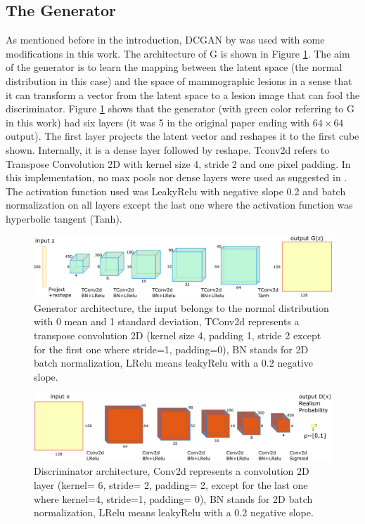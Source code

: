 \documentclass[final,3p,twocolumn,authoryear,sort&compress,times]{maia}
\begin{document}
\subsection{The Generator}
As mentioned before in the introduction, DCGAN by \citet{radford_DCGAN} was used with some modifications in this work. The architecture of G is shown in Figure \ref{fig:arch_Gen}.
The aim of the generator is to learn the mapping between the latent space (the normal distribution in this case) and the space of mammographic lesions in a sense that it can transform a vector from the latent space to a lesion image that can fool the discriminator. Figure \ref{fig:arch_Gen} shows that the generator (with green color referring to G in this work) had six layers (it was 5 in the original paper ending with $64 \times 64$ output). The first layer projects the latent vector and reshapes it to the first cube shown. Internally, it is a dense layer followed by reshape. Tconv2d refers to Transpose Convolution 2D with kernel size 4, stride 2 and one pixel padding. In this implementation, no max pools nor dense layers were used as suggested in \citet{radford_DCGAN}. The activation function used was LeakyRelu with negative slope 0.2 and batch normalization on all layers except the last one where the activation function was hyperbolic tangent (Tanh).
\begin{figure}[htp]
    \centering
    \includegraphics[scale=0.34]{figures/G_architecture.pdf}
    \caption{Generator architecture, the input belongs to the normal distribution with 0 mean and 1 standard deviation, TConv2d represents a transpose convolution 2D (kernel size 4, padding 1, stride 2 except for the first one where stride=1, padding=0), BN stands for 2D batch normalization, LRelu means leakyRelu with a 0.2 negative slope.}
    \label{fig:arch_Gen}
\end{figure}
\begin{figure}[htp]
    \centering
    \includegraphics[scale=0.34]{figures/D_architecture.pdf}
    \caption{Discriminator architecture, Conv2d represents a convolution 2D layer (kernel= 6, stride= 2, padding= 2, except for the last one where kernel=4, stride=1, padding= 0), BN stands for 2D batch normalization, LRelu means leakyRelu with a 0.2 negative slope.}
    \label{fig:arch_Dis}
\end{figure}
\end{document}
